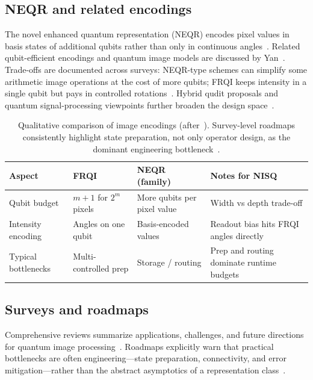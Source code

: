 \subsection{NEQR and related encodings}
The novel enhanced quantum representation (NEQR) encodes pixel values in basis states of additional qubits rather than only in continuous angles~\cite{Zhang2013NEQR}. Related qubit-efficient encodings and quantum image models are discussed by Yan~\cite{Yan2014QImageRepresentation}. Trade-offs are documented across surveys: NEQR-type schemes can simplify some arithmetic image operations at the cost of more qubits; FRQI keeps intensity in a single qubit but pays in controlled rotations~\cite{Su2020NewTrend,Amankwah2022QPIXL,Das2023HybridQuditRGB}. Hybrid qudit proposals and quantum signal-processing viewpoints further broaden the design space~\cite{Dutta2021QuantumMechanicsBased,EbrahimpourKomleh2024QuantumComputingImageProcessing}.

\begin{table}[htbp]
\centering
\caption{Qualitative comparison of image encodings (after~\cite{Le2011FRQI,Zhang2013NEQR,Wang2022ReviewQIP}). Survey-level roadmaps consistently highlight state preparation, not only operator design, as the dominant engineering bottleneck~\cite{Farooq2025SystematicReview,Ruan2021OpportunitiesChallenges}.}
\label{tab:repr-compare}
\begin{tabular}{p{2.2cm}p{3.8cm}p{3.8cm}p{3.8cm}}
\toprule
Aspect & FRQI & NEQR (family) & Notes for NISQ \\
\midrule
Qubit budget & $m{+}1$ for $2^m$ pixels & More qubits per pixel value & Width vs depth trade-off \\
Intensity encoding & Angles on one qubit & Basis-encoded values & Readout bias hits FRQI angles directly \\
Typical bottlenecks & Multi-controlled prep & Storage / routing & Prep and routing dominate runtime budgets \\
\bottomrule
\end{tabular}
\end{table}

\subsection{Surveys and roadmaps}
Comprehensive reviews summarize applications, challenges, and future directions for quantum image processing~\cite{Ruan2021OpportunitiesChallenges,Wang2022ReviewQIP,Farooq2025SystematicReview,EbrahimpourKomleh2024QuantumComputingImageProcessing}. Roadmaps explicitly warn that practical bottlenecks are often engineering---state preparation, connectivity, and error mitigation---rather than the abstract asymptotics of a representation class~\cite{Iliyasu2013FRQIroadmap,Geng2023ImprovedFRQI}.

